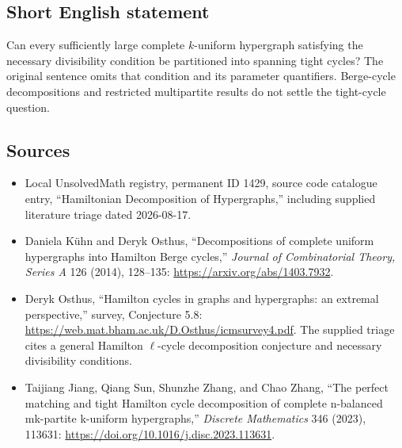 \documentclass[11pt]{article}
\begin{document}
\subsection{Short English statement}
Can every sufficiently large complete \(k\)-uniform hypergraph satisfying the necessary divisibility condition be partitioned into spanning tight cycles? The original sentence omits that condition and its parameter quantifiers. Berge-cycle decompositions and restricted multipartite results do not settle the tight-cycle question.
\subsection{Sources}
\begin{itemize}
\item Local UnsolvedMath registry, permanent ID 1429, source code catalogue entry, ``Hamiltonian Decomposition of Hypergraphs,'' including supplied literature triage dated 2026-08-17.
\item Daniela K\"uhn and Deryk Osthus, ``Decompositions of complete uniform hypergraphs into Hamilton Berge cycles,'' \emph{Journal of Combinatorial Theory, Series A} 126 (2014), 128--135: \url{https://arxiv.org/abs/1403.7932}.
\item Deryk Osthus, ``Hamilton cycles in graphs and hypergraphs: an extremal perspective,'' survey, Conjecture 5.8: \url{https://web.mat.bham.ac.uk/D.Osthus/icmsurvey4.pdf}. The supplied triage cites a general Hamilton \(\ell\)-cycle decomposition conjecture and necessary divisibility conditions.
\item Taijiang Jiang, Qiang Sun, Shunzhe Zhang, and Chao Zhang, ``The perfect matching and tight Hamilton cycle decomposition of complete n-balanced mk-partite k-uniform hypergraphs,'' \emph{Discrete Mathematics} 346 (2023), 113631: \url{https://doi.org/10.1016/j.disc.2023.113631}.
\end{itemize}
\end{document}
